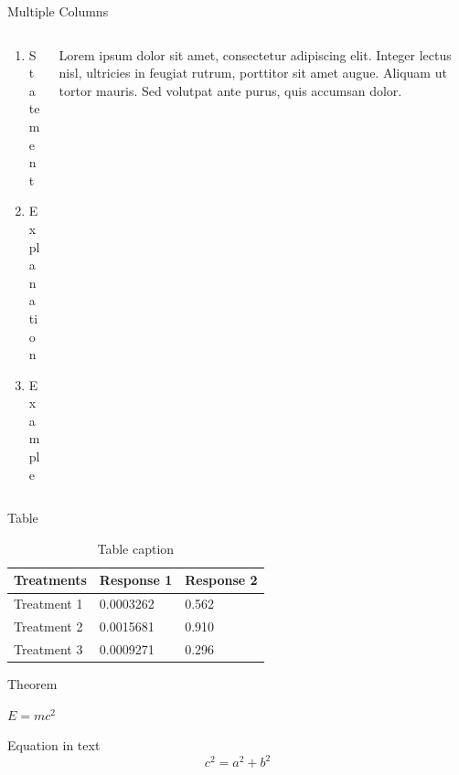 \documentclass[aspectratio=169,xcolor=dvipsnames, t]{beamer}
\begin{document}
    \begin{frame}{Multiple Columns}
        \begin{columns}
            \begin{column}{0.45\textwidth}
                \begin{enumerate}
                    \item Statement
                    \item Explanation
                    \item Example
                \end{enumerate}
            \end{column}
            \begin{column}{0.45\textwidth}  %
                Lorem ipsum dolor sit amet, consectetur adipiscing elit. Integer lectus nisl, ultricies in feugiat rutrum, porttitor sit amet augue. Aliquam ut tortor mauris. Sed volutpat ante purus, quis accumsan dolor.
            \end{column}
        \end{columns}
    \end{frame}
    \begin{frame}{Table}
        \begin{table}
            \begin{tabular}{l l l}
                \toprule
                \textbf{Treatments} & \textbf{Response 1} & \textbf{Response 2} \\
                \midrule
                Treatment 1         & 0.0003262           & 0.562               \\
                Treatment 2         & 0.0015681           & 0.910               \\
                Treatment 3         & 0.0009271           & 0.296               \\
                \bottomrule
            \end{tabular}
            \caption{Table caption}
        \end{table}
    \end{frame}

    \begin{frame}{Theorem}
        \begin{theorem}
            $E = mc^2$
        \end{theorem}
        Equation in text
        \begin{equation}
            c^{2} = a^{2} + b^{2}
        \end{equation}
    \end{frame}
\end{document}
